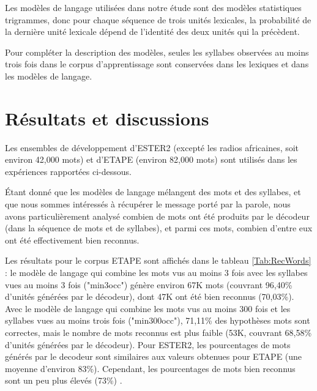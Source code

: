 \documentclass[10pt,a4paper,twoside]{article}
\begin{document}
Les modèles de langage utilisées dans notre étude sont des modèles statistiques trigrammes, donc pour chaque séquence de trois unités lexicales, la probabilité de la dernière unité lexicale dépend de l'identité des deux unités qui la précèdent.

Pour compléter la description des modèles, seules les syllabes observées au moins trois fois dans le corpus d’apprentissage sont conservées dans les lexiques et dans les modèles de langage.



\section{Résultats et discussions}

Les ensembles de développement d'ESTER2 (excepté les radios africaines, soit environ 42,000 mots) et d'ETAPE (environ 82,000 mots) sont utilisés dans les expériences rapportées ci-dessous.

Étant donné que les modèles de langage mélangent des mots et des syllabes, et que nous sommes intéressés à récupérer le message porté par la parole, nous avons particulièrement analysé combien de mots ont été produits par le décodeur (dans la séquence de mots et de syllabes), et parmi ces mots, combien d’entre eux ont été effectivement bien reconnus.

Les résultats pour le corpus ETAPE sont affichés dans le tableau \ref{Tab:RecWords} : le modèle de langage qui combine les mots vus au moins 3 fois avec les syllabes vues au moins 3 fois ("min3occ") génère environ 67K mots (couvrant 96,40\% d'unités générées par le décodeur), dont 47K ont été bien reconnus (70,03\%). Avec le modèle de langage qui combine les mots vus au moins 300 fois et les syllabes vues au moins trois fois ("min300occ"), 71,11\% des hypothèses mots sont correctes, mais le nombre de mots reconnus est plus faible (53K, couvrant 68,58\% d'unités générées par le décodeur). 
Pour ESTER2, les pourcentages de mots générés par le decodeur sont similaires aux valeurs obtenues pour ETAPE (une moyenne d'environ 83\%). Cependant, les pourcentages de mots bien reconnus sont un peu plus élevés (73\%) .
\end{document}
